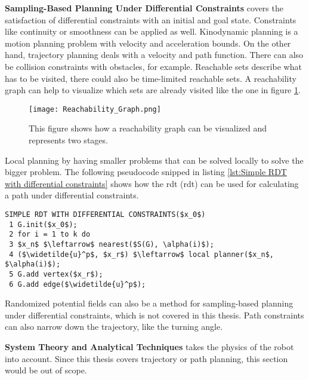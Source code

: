 \textbf{Sampling-Based Planning Under Differential Constraints} covers the satisfaction of differential constraints with an initial and goal state. Constraints like continuity or smoothness can be applied as well. Kinodynamic planning is a motion planning problem with velocity and acceleration bounds. On the other hand, trajectory planning deals with a velocity and path function. There can also be collision constraints with obstacles, for example.
Reachable sets describe what has to be visited, there could also be time-limited reachable sets. A reachability graph can help to visualize which sets are already visited like the one in figure \ref{fig:Reachability Graph}.
\begin{figure}[H]
    \centering
    \texttt{[image: Reachability\_Graph.png]}
    \caption{This figure shows how a reachability graph can be visualized and represents two stages. \cite{planning_algorithms_steven_m_lavalle}}
    \label{fig:Reachability Graph}
\end{figure}
Local planning by having smaller problems that can be solved locally to solve the bigger problem. The following pseudocode snipped in listing \ref{lst:Simple RDT with differential constraints} shows how the \acrlong{rdt} (\acrshort{rdt}) can be used for calculating a path under differential constraints.
\begin{lstlisting}[mathescape=true, caption={The local planning method computes $x_r$. A new vertex will be available: $x_r$. \cite{planning_algorithms_steven_m_lavalle}}, label={lst:Simple RDT with differential constraints}]
SIMPLE RDT WITH DIFFERENTIAL CONSTRAINTS($x_0$)
 1 G.init($x_0$);
 2 for i = 1 to k do
 3 $x_n$ $\leftarrow$ nearest($S(G), \alpha(i)$);
 4 ($\widetilde{u}^p$, $x_r$) $\leftarrow$ local planner($x_n$, $\alpha(i)$);
 5 G.add vertex($x_r$);
 6 G.add edge($\widetilde{u}^p$);
\end{lstlisting}
Randomized potential fields can also be a method for sampling-based planning under differential constraints, which is not covered in this thesis. Path constraints can also narrow down the trajectory, like the turning angle. \cite{planning_algorithms_steven_m_lavalle}

\textbf{System Theory and Analytical Techniques} takes the physics of the robot into account. Since this thesis covers trajectory or path planning, this section would be out of scope. \cite{planning_algorithms_steven_m_lavalle}
